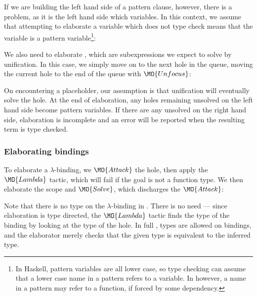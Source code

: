 If we are building the left hand side of a pattern clause, however, there is a
problem, as it is the left hand side which  variables. In this
context, we assume that attempting to elaborate a variable which does not type
check means that the variable is a pattern variable\footnote{In Haskell,
pattern variables are all lower case, so type checking can assume that a
lower case name in a pattern refers to a variable. In \Idris{} however, a
name in a pattern may refer to a function, if forced by some dependency.}:


We also need to elaborate , which are subexpressions we expect to
solve by unification. In this case, we simply move on to the next hole in the queue, moving
the current hole to the end of the queue with $\MO{Unfocus}$:


On encountering a placeholder, our assumption is that unification will
eventually solve the hole. At the end of elaboration, any holes remaining
unsolved on the left hand side become pattern variables. If there are any
unsolved on the right hand side, elaboration is incomplete and an error will
be reported when the resulting term is type checked.

\subsubsection{Elaborating bindings}

To elaborate a $\lambda$-binding, we $\MO{Attack}$ the hole, then apply the
$\MO{Lambda}$ tactic, which will fail if the goal is not a function type. We
then elaborate the scope and $\MO{Solve}$, which discharges the $\MO{Attack}$:


Note that there is no type on the $\lambda$-binding in \IdrisM{}. There is no need --- since
elaboration is type directed, the $\MO{Lambda}$ tactic finds the type of the binding by
looking at the type of the hole. In full \Idris{}, types are allowed on bindings, and the
elaborator merely checks that the given type is equivalent to the inferred type.

